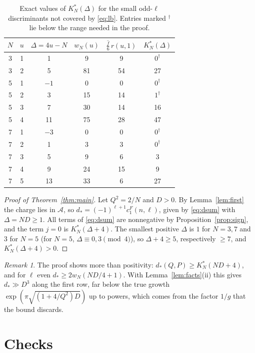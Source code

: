 \documentclass[mathematics,article,submit,pdftex,oneauthor]{Definitions/mdpi}
\numberwithin{equation}{section}
\theoremstyle{plain}
\theoremstyle{remark}
\newtheorem{rem}[thm]{Remark}
\newcommand{\cA}{\mathcal{A}}
\begin{document}
\begin{table}[t]
\caption{Exact values of $K^*_N(\Delta)$ for the small odd-$\ell$ discriminants not covered by \eqref{eq:lb}. Entries marked $^\dagger$ lie below the range needed in the proof.}
\label{tab:small}
\centering
\begin{tabular}{cccccc}
\toprule
$N$ & $u$ & $\Delta=4u-N$ & $w_N(u)$ & $\frac{\hat f}6\,r(u,1)$ & $K^*_N(\Delta)$\\
\midrule
3 & 1 & 1 & 9 & 9 & $0^\dagger$\\
3 & 2 & 5 & 81 & 54 & 27\\
5 & 1 & $-1$ & 0 & 0 & $0^\dagger$\\
5 & 2 & 3 & 15 & 14 & $1^\dagger$\\
5 & 3 & 7 & 30 & 14 & 16\\
5 & 4 & 11 & 75 & 28 & 47\\
7 & 1 & $-3$ & 0 & 0 & $0^\dagger$\\
7 & 2 & 1 & 3 & 3 & $0^\dagger$\\
7 & 3 & 5 & 9 & 6 & 3\\
7 & 4 & 9 & 24 & 15 & 9\\
7 & 5 & 13 & 33 & 6 & 27\\
\bottomrule
\end{tabular}
\end{table}

\begin{proof}[Proof of Theorem~\ref{thm:main}]
Let $Q^2=2/N$ and $D>0$. By Lemma~\ref{lem:first} the charge lies in $\cA$, so $d_*=(-1)^{\ell+1}c^F_1(n,\ell)$, given by \eqref{eq:dsum} with $\Delta=ND\ge1$. All terms of \eqref{eq:dsum} are nonnegative by Proposition~\ref{prop:sign}, and the term $j=0$ is $K^*_N(\Delta+4)$. The smallest positive $\Delta$ is $1$ for $N=3,7$ and $3$ for $N=5$ (for $N=5$, $\Delta\equiv0,3\pmod4$), so $\Delta+4\ge5$, respectively $\ge7$, and $K^*_N(\Delta+4)>0$.
\end{proof}

\begin{rem}
The proof shows more than positivity: $d_*(Q,P)\ge K^*_N(ND+4)$, and for $\ell$ even $d_*\ge2w_N(ND/4+1)$. With Lemma~\ref{lem:facts}(ii) this gives $d_*\gg D^3$ along the first row, far below the true growth $\exp(\pi\sqrt{(1+4/Q^2)D})$ up to powers, which comes from the factor $1/g$ that the bound discards.
\end{rem}

\section{Checks}\label{sec:checks}
\end{document}
